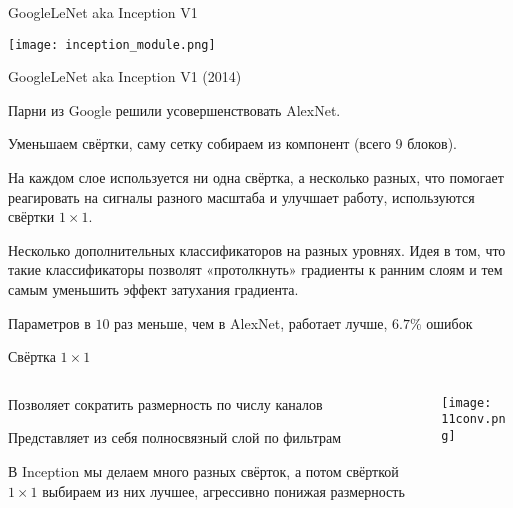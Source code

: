 \documentclass[notes,12pt, aspectratio=169]{beamer}
\newenvironment{wideitemize}{\itemize\addtolength{\itemsep}{10pt}}{\enditemize}
\begin{document}
\begin{frame}{GoogleLeNet aka Inception V1}
\begin{center}
\texttt{[image: inception\_module.png]}
\end{center}
\end{frame}


\begin{frame}{GoogleLeNet aka Inception V1  (2014)}
\begin{wideitemize}
\item  Парни из Google решили усовершенствовать AlexNet.

\item  Уменьшаем свёртки, саму \alert{сетку собираем из компонент}  (всего 9 блоков).

\item  На каждом слое используется ни одна свёртка, а несколько разных, что помогает реагировать на сигналы разного масштаба и улучшает работу, используются  \alert{свёртки $1 \times 1$.}

\item \alert{Несколько дополнительных классификаторов на разных уровнях.} Идея в том, что такие классификаторы позволят «протолкнуть» градиенты к ранним слоям и тем самым уменьшить эффект затухания градиента.

\item  Параметров  в $10$ раз меньше, чем в AlexNet, работает лучше, $6.7\%$ ошибок 
\end{wideitemize}
\end{frame}


\begin{frame}{Свёртка $1 \times 1$}
\begin{columns}[T] %
\begin{column}{.4\textwidth}
\begin{wideitemize}
\item  Позволяет сократить размерность по числу каналов
\item  Представляет из себя полносвязный слой по фильтрам 
\item  В Inception мы делаем много разных свёрток, а потом свёрткой $1 \times 1$ выбираем из них лучшее, агрессивно понижая размерность
\end{wideitemize}
\end{column}%
\hfill%
\begin{column}{.6\textwidth}
\texttt{[image: 11conv.png]}
\end{column}%
\end{columns}
\end{frame}
\end{document}
